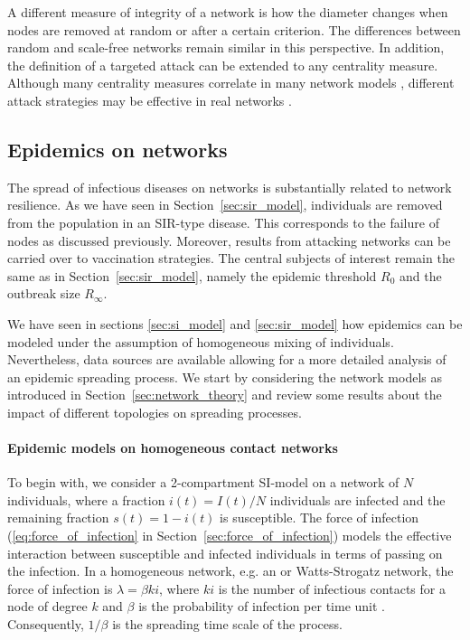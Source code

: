 A different measure of integrity of a network is how the diameter changes when nodes are removed at random or after a certain criterion.
The differences between random and scale-free networks remain similar in this perspective.
In addition, the definition of a targeted attack can be extended to any centrality measure.
Although many centrality measures correlate in many network models \citep{dynamical_processes}, different attack strategies may be effective in real networks \citep{holme:2002}.

\subsection{Epidemics on networks}\label{sec:epi_networks}
The spread of infectious diseases on networks is substantially related to network resilience.
As we have seen in Section~\ref{sec:sir_model}, individuals are removed from the population in an SIR-type disease.
This corresponds to the failure of nodes as discussed previously.
Moreover, results from attacking networks can be carried over to vaccination strategies.
The central subjects of interest remain the same as in Section~\ref{sec:sir_model}, namely the epidemic threshold $R_0$ and the outbreak size $R_\infty $.

We have seen in sections \ref{sec:si_model} and \ref{sec:sir_model} how epidemics can be modeled under the assumption of homogeneous mixing of individuals.
Nevertheless, data sources are available allowing for a more detailed analysis of an epidemic spreading process.
We start by considering the network models as introduced in Section~\ref{sec:network_theory} and review some results about the impact of different topologies on spreading processes.

\paragraph{Epidemic models on homogeneous contact networks\color{Cayenne}{.}}
To begin with, we consider a 2-compartment SI-model on a network of $N$ individuals, where a fraction $i(t)=I(t)/N$ individuals are infected and the remaining fraction $s(t)=1-i(t)$ is susceptible.
The force of infection (\eqref{eq:force_of_infection} in Section~\ref{sec:force_of_infection}) models the effective interaction between susceptible and infected individuals in terms of passing on the infection.
In a homogeneous network, e.g. an \ER or Watts-Strogatz network, the force of infection is $\lambda = \beta ki$, where $ki$ is the number of infectious contacts for a node of degree $k$ and $\beta $ is the probability of infection per time unit \citep{dynamical_processes}.
Consequently, $1/\beta $ is the spreading time scale of the process.

